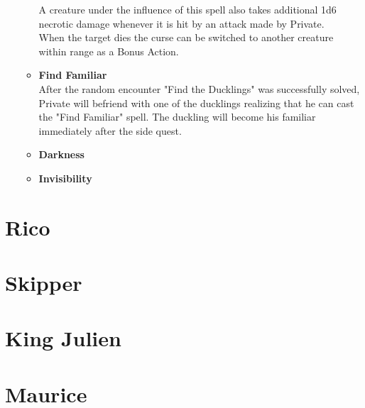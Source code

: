 \begin{itemize}
\begin{itemize}
		A creature under the influence of this spell also takes additional 1d6 necrotic damage whenever it is hit by an attack made by Private.\\
		When the target dies the curse can be switched to another creature within range as a Bonus Action.
		\item \textcolor{titlered}{\textbf{Find Familiar}}\\
		After the random encounter "Find the Ducklings" was successfully solved, Private will befriend with one of the ducklings realizing that he can cast the "Find Familiar" spell. The duckling will become his familiar immediately after the side quest.
		\item \textcolor{titlered}{\textbf{Darkness}}\\
		\item \textcolor{titlered}{\textbf{Invisibility}}\\
	\end{itemize}
\end{itemize}
\clearpage
\section*{Rico}
\clearpage
\section*{Skipper}
\clearpage
\section*{King Julien}
\clearpage
\section*{Maurice}
